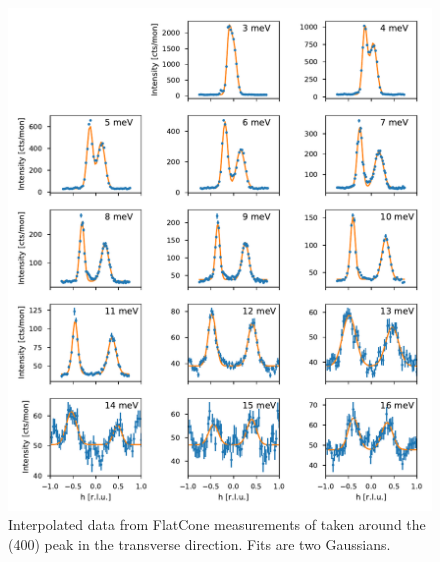 \begin{figure}
    \centering
    \includegraphics[width=\textwidth]{fig/lowen/fits_400T.pdf}
    \caption[400T flatcone raw data]{Interpolated data from FlatCone measurements of \LSCOOsix{} taken around the (400) peak in the transverse direction. Fits are two Gaussians.}
    \label{fig:flatcone_phonons_400T_raw}
\end{figure}

